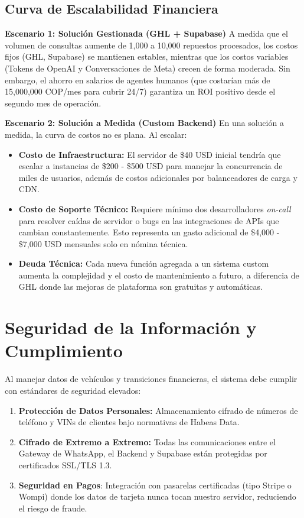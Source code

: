 \documentclass[12pt,a4paper]{article}
\begin{document}
\subsection{Curva de Escalabilidad Financiera}
\textbf{Escenario 1: Soluci\'on Gestionada (GHL + Supabase)}
A medida que el volumen de consultas aumente de 1,000 a 10,000 repuestos procesados, los costos fijos (GHL, Supabase) se mantienen estables, mientras que los costos variables (Tokens de OpenAI y Conversaciones de Meta) crecen de forma moderada. Sin embargo, el ahorro en salarios de agentes humanos (que costarían más de 15,000,000 COP/mes para cubrir 24/7) garantiza un ROI positivo desde el segundo mes de operaci\'on.

\textbf{Escenario 2: Soluci\'on a Medida (Custom Backend)}
En una soluci\'on a medida, la curva de costos no es plana. Al escalar:
\begin{itemize}
    \item \textbf{Costo de Infraestructura:} El servidor de \$40 USD inicial tendr\'ia que escalar a instancias de \$200 - \$500 USD para manejar la concurrencia de miles de usuarios, adem\'as de costos adicionales por balanceadores de carga y CDN.
    \item \textbf{Costo de Soporte T\'ecnico:} Requiere m\'inimo dos desarrolladores \textit{on-call} para resolver ca\'idas de servidor o bugs en las integraciones de APIs que cambian constantemente. Esto representa un gasto adicional de \$4,000 - \$7,000 USD mensuales solo en n\'omina t\'ecnica.
    \item \textbf{Deuda T\'ecnica:} Cada nueva funci\'on agregada a un sistema custom aumenta la complejidad y el costo de mantenimiento a futuro, a diferencia de GHL donde las mejoras de plataforma son gratuitas y autom\'aticas.
\end{itemize}

\newpage

\newpage

\section{Seguridad de la Información y Cumplimiento}
Al manejar datos de vehículos y transiciones financieras, el sistema debe cumplir con est\'andares de seguridad elevados:
\begin{enumerate}
    \item \textbf{Protección de Datos Personales:} Almacenamiento cifrado de números de teléfono y VINs de clientes bajo normativas de Habeas Data.
    \item \textbf{Cifrado de Extremo a Extremo:} Todas las comunicaciones entre el Gateway de WhatsApp, el Backend y Supabase est\'an protegidas por certificados SSL/TLS 1.3.
    \item \textbf{Seguridad en Pagos}: Integración con pasarelas certificadas (tipo Stripe o Wompi) donde los datos de tarjeta nunca tocan nuestro servidor, reduciendo el riesgo de fraude.
\end{enumerate}
\end{document}
